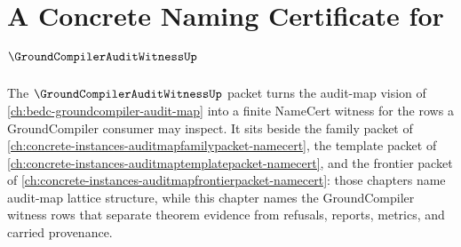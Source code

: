 \chapter{A Concrete Naming Certificate for $\GroundCompilerAuditWitnessUp$}
\label{ch:concrete-instances-groundcompilerauditwitness-namecert}

The $\GroundCompilerAuditWitnessUp$ packet turns the audit-map vision of \autoref{ch:bedc-groundcompiler-audit-map} into a finite NameCert witness for the rows a GroundCompiler consumer may inspect. It sits beside the family packet of \autoref{ch:concrete-instances-auditmapfamilypacket-namecert}, the template packet of \autoref{ch:concrete-instances-auditmaptemplatepacket-namecert}, and the frontier packet of \autoref{ch:concrete-instances-auditmapfrontierpacket-namecert}: those chapters name audit-map lattice structure, while this chapter names the GroundCompiler witness rows that separate theorem evidence from refusals, reports, metrics, and carried provenance.

